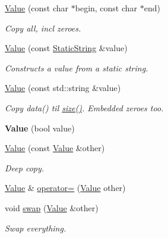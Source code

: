 \begin{DoxyCompactItemize}
\hyperlink{class_json_1_1_value_a39fa09d1902efbd4350e1236db920571}{Value} (const char $\ast$begin, const char $\ast$end)
\begin{DoxyCompactList}\small\item\em Copy all, incl zeroes. \end{DoxyCompactList}\item 
\hyperlink{class_json_1_1_value_a081830e95f88a37054da7e46c65b0766}{Value} (const \hyperlink{class_json_1_1_static_string}{Static\+String} \&value)
\begin{DoxyCompactList}\small\item\em Constructs a value from a static string. \end{DoxyCompactList}\item 
\mbox{\label{class_json_1_1_value_aa4501dd4edf3ce3d5145fc656f088b21}} 
\hyperlink{class_json_1_1_value_aa4501dd4edf3ce3d5145fc656f088b21}{Value} (const std\+::string \&value)
\begin{DoxyCompactList}\small\item\em Copy data() til \hyperlink{class_json_1_1_value_a0ec2808e1d7efa4e9fad938d6667be44}{size()}. Embedded zeroes too. \end{DoxyCompactList}\item 
\mbox{\label{class_json_1_1_value_a350a31ea4a30d384994b0bc010b17495}} 
{\bfseries Value} (bool value)
\item 
\mbox{\label{class_json_1_1_value_a436dfd3670f95fd665f680eba5cebcf0}} 
\hyperlink{class_json_1_1_value_a436dfd3670f95fd665f680eba5cebcf0}{Value} (const \hyperlink{class_json_1_1_value}{Value} \&other)
\begin{DoxyCompactList}\small\item\em Deep copy. \end{DoxyCompactList}\item 
\hyperlink{class_json_1_1_value}{Value} \& \hyperlink{class_json_1_1_value_a795acb28772da4c5d85ae8f4af36c69f}{operator=} (\hyperlink{class_json_1_1_value}{Value} other)
\item 
\mbox{\label{class_json_1_1_value_aab841120d78e296e1bc06a373345e822}} 
void \hyperlink{class_json_1_1_value_aab841120d78e296e1bc06a373345e822}{swap} (\hyperlink{class_json_1_1_value}{Value} \&other)
\begin{DoxyCompactList}\small\item\em Swap everything. \end{DoxyCompactList}\item 

\end{DoxyCompactItemize}
